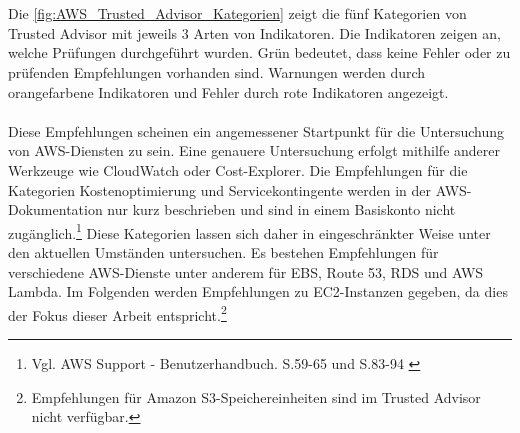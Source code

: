 \\\\
Die \autoref{fig:AWS_Trusted_Advisor_Kategorien} zeigt die fünf Kategorien von Trusted Advisor mit jeweils 3 Arten von Indikatoren. Die Indikatoren zeigen an, welche Prüfungen durchgeführt wurden. Grün bedeutet, dass keine Fehler oder zu prüfenden Empfehlungen vorhanden sind. Warnungen werden durch orangefarbene Indikatoren und Fehler durch rote Indikatoren angezeigt. 
\\\\
Diese Empfehlungen scheinen ein angemessener Startpunkt für die Untersuchung von AWS-Diensten zu sein. Eine genauere Untersuchung erfolgt mithilfe anderer Werkzeuge wie CloudWatch oder Cost-Explorer. %
Die Empfehlungen für die Kategorien Kostenoptimierung und Servicekontingente werden in der AWS-Dokumentation nur kurz beschrieben und sind in einem Basiskonto nicht zugänglich.\footnote{Vgl. AWS Support - Benutzerhandbuch. S.59-65 und S.83-94 \cite{AMZ37}} Diese Kategorien lassen sich daher in eingeschränkter Weise unter den aktuellen Umständen untersuchen.
%
Es bestehen Empfehlungen für verschiedene AWS-Dienste unter anderem für EBS, Route 53, RDS und AWS Lambda. Im Folgenden werden Empfehlungen zu EC2-Instanzen gegeben, da dies der Fokus dieser Arbeit entspricht.\footnote{Empfehlungen für Amazon S3-Speichereinheiten sind im Trusted Advisor nicht verfügbar.}
